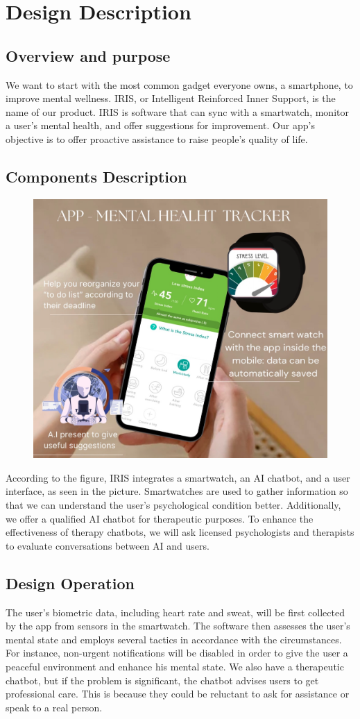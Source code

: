 \documentclass[12pt]{article}
\begin{document}
\section*{Design Description}
\subsection*{Overview and purpose}
We want to start with the most common gadget everyone owns, a smartphone, to improve mental wellness. IRIS, or Intelligent Reinforced Inner Support, is the name of our product. IRIS is software that can sync with a smartwatch, monitor a user's mental health, and offer suggestions for improvement. Our app's objective is to offer proactive assistance to raise people's quality of life.


\subsection*{Components Description}
\begin{figure}[H]
    \centering
    \includegraphics[width = .5\linewidth]{Figure1}
\end{figure}


According to the figure, IRIS integrates a smartwatch, an AI chatbot, and a user interface, as seen in the picture. Smartwatches are used to gather information so that we can understand the user's psychological condition better. Additionally, we offer a qualified AI chatbot for therapeutic purposes. To enhance the effectiveness of therapy chatbots, we will ask licensed psychologists and therapists to evaluate conversations between AI and users.


\subsection*{Design Operation}
The user's biometric data, including heart rate and sweat, will be first collected by the app from sensors in the smartwatch. The software then assesses the user's mental state and employs several tactics in accordance with the circumstances. For instance, non-urgent notifications will be disabled in order to give the user a peaceful environment and enhance his mental state. We also have a therapeutic chatbot, but if the problem is significant, the chatbot advises users to get professional care. This is because they could be reluctant to ask for assistance or speak to a real person.
\end{document}

